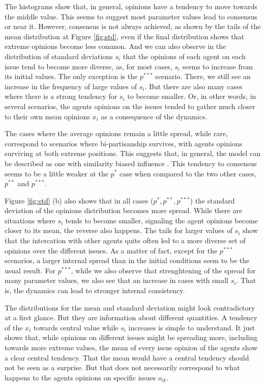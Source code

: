 \documentclass{article}
\begin{document}
{The histograms show that, in general, opinions have a tendency to move towards
the middle value. This seems to suggest most parameter values lead to consensus
or near it. However, consensus is not always achieved, as shown by the tails of
the mean distribution at Figure \ref{fig:std}, even if the final distribution
shows that extreme opinions become less common. And we can also observe in the
distribution of standard deviations $s_i$ that the opinions of each agent on
each issue tend to become more diverse, as, for most cases, $s_i$ seems to
increase from its initial values. The only exception is the $p^{***}$ scenario.
There, we still see an increase in the frequency of large values of $s_i$. But
there are also many cases where there is a strong tendency for $s_i$ to become
smaller. Or, in other words, in several scenarios, the agents opinions on the
issues tended to gather much closer to their own mean opinions $x_i$ as a
consequence of the dynamics.

The cases where the average opinions remain a little spread, while rare,
correspond to scenarios where bi-partisanship survives, with agents opinions
surviving at both extreme positions. This suggests that, in general, the model
can be described as one with similarity biased influence \cite{flache2017}. This
tendency to consensus seems to be a little weaker at the \(p^*\) case when
compared to the two other cases, $p^{**}$ and $p^{***}$.


Figure \ref{fig:std} (b) also shows that in all cases (\(p^{*}, p^{**},
p^{***}\)) the standard deviation of the opinions distribution becomes more
spread. While there are situations where $s_i$ tends to become smaller,
signaling the agent opinions become closer to its mean, the reverse also
happens. The tails for larger values of $s_i$ show that the intercation with
other agents quite often led to a more diverse set of opinions over the
different issues. As a matter of fact, except for the $p^{***}$ scenarios, a
larger internal spread than in the initial conditions seem to be the usual
result. For $p^{***}$, while we also observe that strenghtening of the spread
for many parameter values, we also see that an increase in cases with small
$s_i$. That is, the dynamics can lead to stronger internal consistency.

The distributions for the mean and standard deviation might look contradictory
at a first glance. But they are information about different quantities. A
tendency of the $x_i$ towards central value while $s_i$ increases is simple to
understand. It just shows that, while opinions on different issues might be
spreading more, including towards more extreme values, the mean of every issue
opinion of the agents show a clear central tendency. That the mean would have a
central tendency should not be seen as a surprise. But that does not necessarily
correspond to what happens to the agents  opinions on specific issues $o_{ik}$.

}
\end{document}
